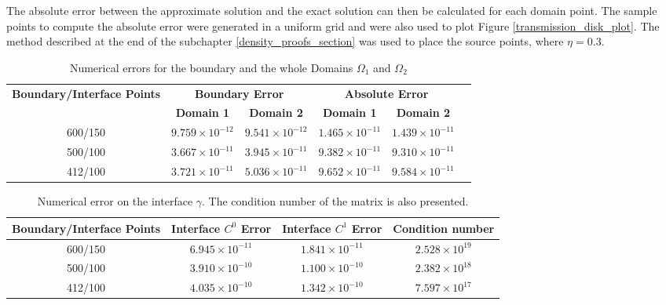The absolute error between the approximate solution and the exact solution can then be calculated for each domain point. The sample points to compute the absolute error were generated in a uniform grid and were also used to plot Figure \ref{transmission_disk_plot}. The method described at the end of the subchapter \ref{density_proofs_section} was used to place the source points, where \(\eta=0.3\).

\begin{table}[htbp]
    \centering
    \begin{tabular}{cccccc}
        \toprule
        \multirow{2}{*}{\textbf{Boundary/Interface Points}} & \multicolumn{2}{c}{\textbf{Boundary Error}} & \multicolumn{2}{c}{\textbf{Absolute Error}} \\
        \cmidrule(lr){2-3} \cmidrule(lr){4-5}
        & \textbf{Domain 1} & \textbf{Domain 2} & \textbf{Domain 1} & \textbf{Domain 2} \\
        \midrule
        600/150 & $9.759\times10^{-12}$ & $9.541\times10^{-12}$ & $1.465\times10^{-11}$ & $1.439\times10^{-11}$ \\
        500/100 & $3.667\times10^{-11}$ & $3.945\times10^{-11}$ & $9.382\times10^{-11}$ & $9.310\times10^{-11}$ \\
        412/100 & $3.721\times10^{-11}$ & $5.036\times10^{-11}$ & $9.652\times10^{-11}$ & $9.584\times10^{-11}$ \\
        \bottomrule
    \end{tabular}
    \caption{Numerical errors for the boundary and the whole Domains \(\Omega_1\) and \(\Omega_2\)}
    \label{tab:transmission_results_1}
\end{table}


\begin{table}[htbp]
    \centering
    \begin{tabular}{cccc}
      \toprule
      \textbf{Boundary/Interface Points} & \textbf{Interface \(C^0\) Error} & \textbf{Interface \(C^1\) Error} & \textbf{Condition number} \\
      \midrule
      600/150 & $6.945\times10^{-11}$ & $1.841\times10^{-11}$ & $2.528\times 10^{19}$\\
      500/100 & $3.910\times10^{-10}$ & $1.100\times10^{-10}$ & $2.382\times 10^{18}$\\
      412/100 & $4.035\times10^{-10}$ & $1.342\times10^{-10}$ & $7.597\times 10^{17}$\\
      \bottomrule
    \end{tabular}
    \caption{Numerical error on the interface \(\gamma\). The condition number of the matrix is also presented.}
    \label{tab:transmission_results_2}
\end{table}

